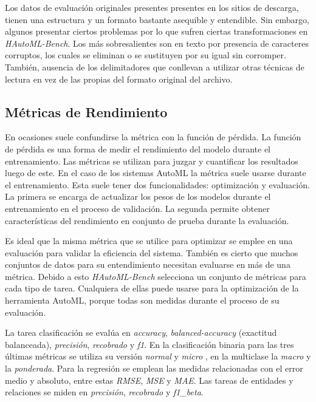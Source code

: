 Los datos de evaluación originales presentes presentes en los sitios de descarga, tienen una estructura y un formato bastante asequible y entendible. 
Sin embargo, algunos presentar ciertos problemas por lo que sufren ciertas transformaciones en \textit{HAutoML-Bench}. Los más sobresalientes son en texto por presencia 
de caracteres corruptos, los cuales se eliminan o se sustituyen por su igual sin corromper. También, ausencia de los delimitadores que conllevan a utilizar otras 
técnicas de lectura en vez de las propias del formato original del archivo.

\subsection{Métricas de Rendimiento}\label{subsection:metrics}

En ocasiones suele confundirse la métrica con la función de pérdida. La función de pérdida es una forma de medir el rendimiento del modelo durante el 
entrenamiento. Las métricas se utilizan para juzgar y cuantificar los resultados luego de este. En el caso de los sistemas AutoML la métrica suele usarse 
durante el entrenamiento. Esta suele tener dos funcionalidades: optimización y evaluación. La primera se encarga de actualizar los pesos de los modelos durante el 
entrenamiento en el proceso de validación. La segunda permite obtener características del rendimiento en conjunto de prueba durante la evaluación.

Es ideal que la misma métrica que se utilice para optimizar se emplee en una evaluación para validar la eficiencia del sistema. También es cierto que muchos conjuntos 
de datos para su entendimiento necesitan evaluarse en más de una métrica. Debido a esto \textit{HAutoML-Bench} selecciona un conjunto de métricas para cada 
tipo de tarea. Cualquiera de ellas puede usarse para la optimización de la herramienta AutoML, porque todas son medidas durante el proceso de su evaluación.

La tarea clasificación se evalúa en \textit{accuracy}, \textit{balanced-accuracy} (exactitud balanceada), \textit{precisión}, \textit{recobrado} y 
\textit{f1}. En la clasificación binaria para las tres últimas métricas se utiliza su versión \textit{normal} y \textit{micro} , en la 
multiclase la \textit{macro} y la \textit{ponderada}. Para la regresión se emplean las medidas relacionadas con el error medio y 
absoluto, entre estas \textit{RMSE}, \textit{MSE} y \textit{MAE}. 
Las tareas de entidades y relaciones se miden en \textit{precisión}, \textit{recobrado} y \textit{f1\_beta}.

